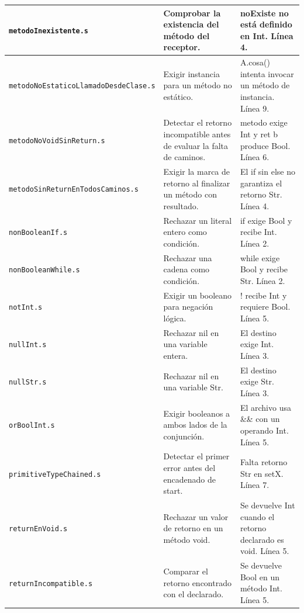 \begin{longtable}{|>{\raggedright\arraybackslash}p{}|>{\raggedright\arraybackslash}p{}|>{\raggedright\arraybackslash}p{}|}
\texttt{metodo\allowbreak Inexistente.s} & Comprobar la existencia del método del receptor. & noExiste no está definido en Int. Línea 4. \\ \hline
\texttt{metodo\allowbreak No\allowbreak Estatico\allowbreak Llamado\allowbreak Desde\allowbreak Clase.s} & Exigir instancia para un método no estático. & A.cosa() intenta invocar un método de instancia. Línea 9. \\ \hline
\texttt{metodo\allowbreak No\allowbreak Void\allowbreak Sin\allowbreak Return.s} & Detectar el retorno incompatible antes de evaluar la falta de caminos. & metodo exige Int y ret b produce Bool. Línea 6. \\ \hline
\texttt{metodo\allowbreak Sin\allowbreak Return\allowbreak En\allowbreak Todos\allowbreak Caminos.s} & Exigir la marca de retorno al finalizar un método con resultado. & El if sin else no garantiza el retorno Str. Línea 4. \\ \hline
\texttt{non\allowbreak Boolean\allowbreak If.s} & Rechazar un literal entero como condición. & if exige Bool y recibe Int. Línea 2. \\ \hline
\texttt{non\allowbreak Boolean\allowbreak While.s} & Rechazar una cadena como condición. & while exige Bool y recibe Str. Línea 2. \\ \hline
\texttt{not\allowbreak Int.s} & Exigir un booleano para negación lógica. & ! recibe Int y requiere Bool. Línea 5. \\ \hline
\texttt{null\allowbreak Int.s} & Rechazar nil en una variable entera. & El destino exige Int. Línea 3. \\ \hline
\texttt{null\allowbreak Str.s} & Rechazar nil en una variable Str. & El destino exige Str. Línea 3. \\ \hline
\texttt{or\allowbreak Bool\allowbreak Int.s} & Exigir booleanos a ambos lados de la conjunción. & El archivo usa \&\& con un operando Int. Línea 5. \\ \hline
\texttt{primitive\allowbreak Type\allowbreak Chained.s} & Detectar el primer error antes del encadenado de start. & Falta retorno Str en setX. Línea 7. \\ \hline
\texttt{return\allowbreak En\allowbreak Void.s} & Rechazar un valor de retorno en un método void. & Se devuelve Int cuando el retorno declarado es void. Línea 5. \\ \hline
\texttt{return\allowbreak Incompatible.s} & Comparar el retorno encontrado con el declarado. & Se devuelve Bool en un método Int. Línea 5. \\ \hline

\end{longtable}
